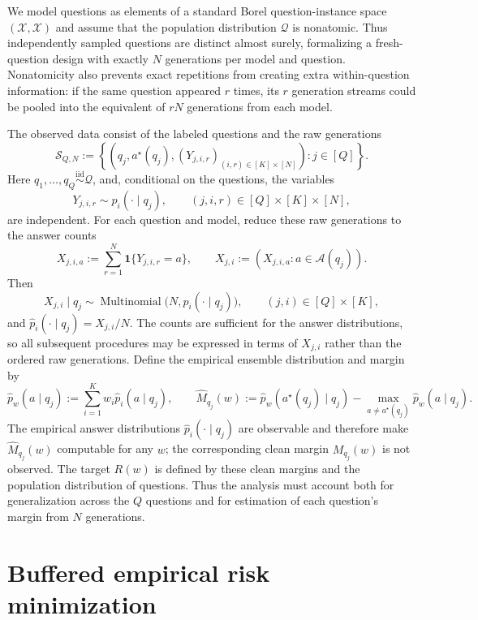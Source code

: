 \documentclass[11pt]{article}
\newcommand{\one}{\mathbf 1}
\newcommand{\calQ}{\mathcal Q}
\newcommand{\calA}{\mathcal A}
\newcommand\ded[1]{{\color{orange!80!black} #1}}
\begin{document}
\ded{We model questions as elements of a standard Borel question-instance space $(\mathcal X,\mathscr X)$ and assume that the population distribution $\calQ$ is nonatomic.  Thus independently sampled questions are distinct almost surely, formalizing a fresh-question design with exactly $N$ generations per model and question.  Nonatomicity also prevents exact repetitions from creating extra within-question information: if the same question appeared $r$ times, its $r$ generation streams could be pooled into the equivalent of $rN$ generations from each model.}

The observed data consist of the labeled questions and the raw generations
\begin{equation}
\label{eq:training-data}
\mathcal S_{Q,N}
:=
\left\{
\left(q_j,a^\star(q_j),
(Y_{j,i,r})_{(i,r)\in[K]\times[N]}
\right):j\in[Q]
\right\}.
\end{equation}
Here $q_1,\dots,q_Q\overset{\mathrm{iid}}{\sim}\calQ$, and, conditional on the questions, the variables
\[
Y_{j,i,r}\sim p_i(\cdot\mid q_j),
\qquad
(j,i,r)\in[Q]\times[K]\times[N],
\]
are independent.  For each question and model, reduce these raw generations to the answer counts
\[
X_{j,i,a}
:=
\sum_{r=1}^N\one\{Y_{j,i,r}=a\},
\qquad
X_{j,i}:=(X_{j,i,a}:a\in\calA(q_j)).
\]
Then
\begin{equation}
\label{eq:count-model}
X_{j,i}\mid q_j\sim
\operatorname{Multinomial}\bigl(N,p_i(\cdot\mid q_j)\bigr),
\qquad (j,i)\in[Q]\times[K],
\end{equation}
and $\widehat p_i(\cdot\mid q_j)=X_{j,i}/N$.  The counts are sufficient for the answer distributions, so all subsequent procedures may be expressed in terms of $X_{j,i}$ rather than the ordered raw generations.  Define the empirical ensemble distribution and margin by
\[
\widehat p_w(a\mid q_j)
:=
\sum_{i=1}^K w_i\widehat p_i(a\mid q_j),
\qquad
\widehat M_{q_j}(w)
:=
\widehat p_w(a^\star(q_j)\mid q_j)
-\max_{a\ne a^\star(q_j)}\widehat p_w(a\mid q_j).
\]
The empirical answer distributions $\widehat p_i(\cdot\mid q_j)$ are observable and therefore make $\widehat M_{q_j}(w)$ computable for any $w$; the corresponding clean margin $M_{q_j}(w)$ is not observed.  The target $R(w)$ is defined by these clean margins and the population distribution of questions.  Thus the analysis must account both for generalization across the $Q$ questions and for estimation of each question's margin from $N$ generations.

\section{Buffered empirical risk minimization}
\label{sec:buffered}
\end{document}
